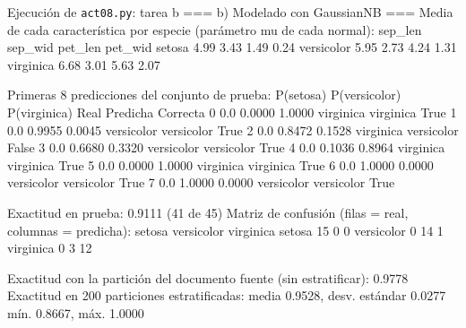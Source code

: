 \documentclass[11pt,letterpaper]{article}
\begin{document}
\begin{consola}[label=out:b]{Ejecución de \texttt{act08.py}: tarea b}
=== b) Modelado con GaussianNB ===
Media de cada característica por especie (parámetro mu de cada normal):
            sep_len  sep_wid  pet_len  pet_wid
setosa         4.99     3.43     1.49     0.24
versicolor     5.95     2.73     4.24     1.31
virginica      6.68     3.01     5.63     2.07

Primeras 8 predicciones del conjunto de prueba:
   P(setosa)  P(versicolor)  P(virginica)        Real    Predicha  Correcta
0        0.0         0.0000        1.0000   virginica   virginica      True
1        0.0         0.9955        0.0045  versicolor  versicolor      True
2        0.0         0.8472        0.1528   virginica  versicolor     False
3        0.0         0.6680        0.3320  versicolor  versicolor      True
4        0.0         0.1036        0.8964   virginica   virginica      True
5        0.0         0.0000        1.0000   virginica   virginica      True
6        0.0         1.0000        0.0000  versicolor  versicolor      True
7        0.0         1.0000        0.0000  versicolor  versicolor      True

Exactitud en prueba: 0.9111 (41 de 45)
Matriz de confusión (filas = real, columnas = predicha):
            setosa  versicolor  virginica
setosa          15           0          0
versicolor       0          14          1
virginica        0           3         12

Exactitud con la partición del documento fuente (sin estratificar): 0.9778
Exactitud en 200 particiones estratificadas: media 0.9528, desv. estándar 0.0277
  mín. 0.8667, máx. 1.0000
\end{consola}
\end{document}
